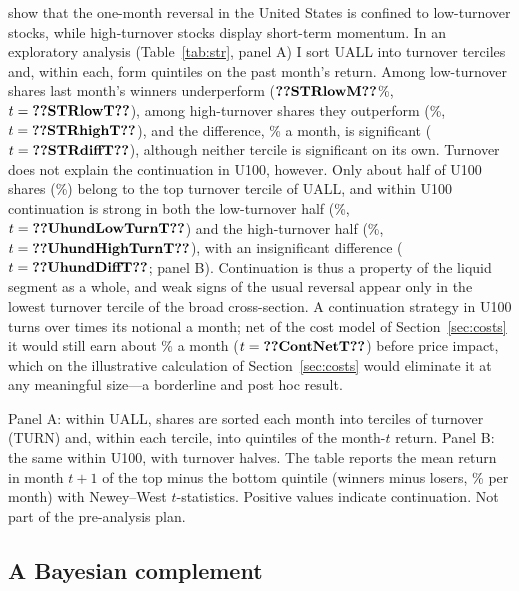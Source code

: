 \documentclass[11pt]{article}
\newcommand{\tabnote}[1]{\par\vspace{3pt}\begin{minipage}{\linewidth}\footnotesize\setstretch{1.0}#1\end{minipage}}
\begin{document}
\citet{medhat2022short} show that the one-month reversal in the United States is confined to low-turnover stocks,
while high-turnover stocks display short-term momentum. In an exploratory analysis (Table~\ref{tab:str}, panel A) I sort
UALL into turnover terciles and, within each, form quintiles on the past month's return. Among low-turnover shares last
month's winners underperform ($\val{STRlowM}$\%, $t=\val{STRlowT}$), among high-turnover shares they outperform
(\%, $t=\val{STRhighT}$), and the difference, \% a month, is significant
($t=\val{STRdiffT}$), although neither tercile is significant on its own. Turnover does not explain the continuation in
U100, however. Only about half of U100 shares (\%) belong to the top turnover tercile of UALL, and
within U100 continuation is strong in both the low-turnover half (\%, $t=\val{UhundLowTurnT}$) and
the high-turnover half (\%, $t=\val{UhundHighTurnT}$), with an insignificant difference
($t=\val{UhundDiffT}$; panel B). Continuation is thus a property of the liquid segment as a whole, and weak signs of
the usual reversal appear only in the lowest turnover tercile of the broad cross-section. A continuation strategy in U100 turns over
 times its notional a month; net of the cost model of Section~\ref{sec:costs} it would still earn
about \% a month ($t=\val{ContNetT}$) before price impact, which on the illustrative calculation of
Section~\ref{sec:costs} would eliminate it at any meaningful size---a borderline and post hoc result.

\begin{table}[!htbp]
\centering\small
\caption{Short-term returns by turnover (exploratory)}\label{tab:str}

\tabnote{Panel A: within UALL, shares are sorted each month into terciles of turnover (TURN) and, within each tercile,
into quintiles of the month-$t$ return. Panel B: the same within U100, with turnover halves. The table reports the mean
return in month $t+1$ of the top minus the bottom quintile (winners minus losers, \% per month) with Newey--West
$t$-statistics. Positive values indicate continuation. Not part of the pre-analysis plan.}
\end{table}

\subsection{A Bayesian complement}\label{sec:eb}
\end{document}
